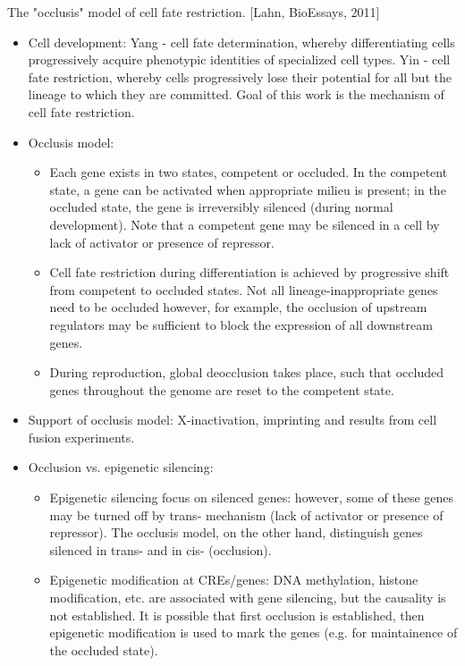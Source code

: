 \documentclass{report}
\begin{document}
The "occlusis" model of cell fate restriction. [Lahn, BioEssays, 2011]
\begin{itemize}
	\item Cell development: Yang - cell fate determination, whereby differentiating cells progressively acquire phenotypic identities of specialized cell types. Yin - cell fate restriction, whereby cells progressively lose their potential for all but the lineage to which they are committed. Goal of this work is the mechanism of cell fate restriction. 
	\item Occlusis model: 
	\begin{itemize}
		\item Each gene exists in two states, competent or occluded. In the competent state, a gene can be activated when appropriate milieu is present; in the occluded state, the gene is irreversibly silenced (during normal development). Note that a competent gene may be silenced in a cell by lack of activator or presence of repressor. 
		\item Cell fate restriction during differentiation is achieved by progressive shift from competent to occluded states. Not all lineage-inappropriate genes need to be occluded however, for example, the occlusion of upstream regulators may be sufficient to block the expression of all downstream genes. 
		\item During reproduction, global deocclusion takes place, such that occluded genes throughout the genome are reset to the competent state. 
	\end{itemize}
	\item Support of occlusis model: X-inactivation, imprinting and results from cell fusion experiments. 
	\item Occlusion vs. epigenetic silencing: 
	\begin{itemize}
		\item Epigenetic silencing focus on silenced genes: however, some of these genes may be turned off by trans- mechanism (lack of activator or presence of repressor). The occlusis model, on the other hand, distinguish genes silenced in trans- and in cis- (occlusion). 
		\item Epigenetic modification at CREs/genes: DNA methylation, histone modification, etc. are associated with gene silencing, but the causality is not established. It is possible that first occlusion is established, then epigenetic modification is used to mark the genes (e.g. for maintainence of the occluded state). 
	\end{itemize}

\end{itemize}
\end{document}
